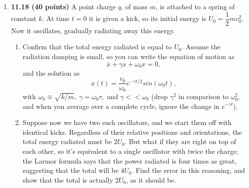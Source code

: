 \documentclass[fleqn]{article}
\begin{document}
\begin{enumerate}
    \item \textbf{11.18 (40 points)} A point charge $q$, of mass $m$, is attached to a spring of constant $k$.
    At time $t=0$ it is given a kick, so its initial energy is $U_0=\dfrac{1}{2} m v^2_0$. Now it oscillates,
    gradually radiating away this energy.
    \begin{enumerate}
      \item Confirm that the total energy radiated is equal to $U_0$. Assume the radiation
      damping is small, so you can write the equation of motion as
      $$
        \ddot{x}+\gamma \dot{x}+\omega_0 x=0,
      $$
      and the solution as
      $$
        x(t)=\dfrac{v_0}{\omega_0} e^{-\gamma t/2} sin(\omega_0 t),
      $$
      with $\omega_0 \equiv \sqrt{k/m}, ~ \gamma=\omega_0 \tau,$ and $\gamma << \omega_0$ (drop $\gamma^2$ in comparison 
      to $\omega^2_0$, and when you average over a complete cycle, ignore the change in $e^{-\gamma t}$).


      \item Suppose now we have two such oscillators, and we start them off with identical
      kicks. Regardless of their relative positions and orientations, the total energy
      radiated must be $2 U_0$. But what if they are right on top of each other, so it's
      equivalent to a single oscillator with twice the charge; the Larmor formula says
      that the power radiated is four times as great, suggesting that the total will be
      $4 U_0$. Find the error in this reasoning, and show that the total is actually $2 U_0$, as
      it should be.


    \end{enumerate}

  \end{enumerate}
\end{document}
